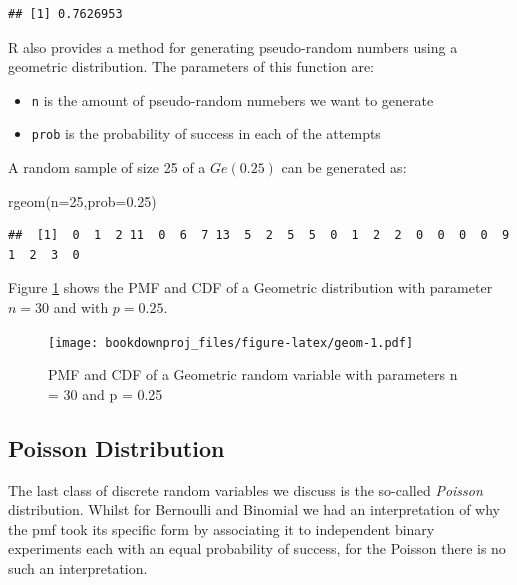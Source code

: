 \documentclass[
]{book}
\newenvironment{Shaded}{\begin{snugshade}}{\end{snugshade}}
\newcommand{\AttributeTok}[1]{\textcolor[rgb]{0.77,0.63,0.00}{#1}}
\newcommand{\DecValTok}[1]{\textcolor[rgb]{0.00,0.00,0.81}{#1}}
\newcommand{\FloatTok}[1]{\textcolor[rgb]{0.00,0.00,0.81}{#1}}
\newcommand{\FunctionTok}[1]{\textcolor[rgb]{0.00,0.00,0.00}{#1}}
\newcommand{\NormalTok}[1]{#1}
\providecommand{\tightlist}{%
  \setlength{\itemsep}{0pt}\setlength{\parskip}{0pt}}
\theoremstyle{definition}
\theoremstyle{definition}
\theoremstyle{definition}
\theoremstyle{definition}
\theoremstyle{remark}
\begin{document}
\begin{verbatim}
## [1] 0.7626953
\end{verbatim}

R also provides a method for generating pseudo-random numbers using a geometric distribution. The parameters of this function are:

\begin{itemize}
\tightlist
\item
  \texttt{n} is the amount of pseudo-random numebers we want to generate
\item
  \texttt{prob} is the probability of success in each of the attempts
\end{itemize}

A random sample of size 25 of a \(Ge(0.25)\) can be generated as:

\begin{Shaded}
\begin{Highlighting}[]
\FunctionTok{rgeom}\NormalTok{(}\AttributeTok{n=}\DecValTok{25}\NormalTok{,}\AttributeTok{prob=}\FloatTok{0.25}\NormalTok{)}
\end{Highlighting}
\end{Shaded}

\begin{verbatim}
##  [1]  0  1  2 11  0  6  7 13  5  2  5  5  0  1  2  2  0  0  0  0  9  1  2  3  0
\end{verbatim}

Figure \ref{fig:geom} shows the PMF and CDF of a Geometric distribution with parameter \(n=30\) and with \(p=0.25\).

\begin{figure}
\centering
\texttt{[image: bookdownproj\_files/figure-latex/geom-1.pdf]}
\caption{\label{fig:geom}PMF and CDF of a Geometric random variable with parameters n = 30 and p = 0.25}
\end{figure}

\hypertarget{poisson-distribution}{%
\subsection{Poisson Distribution}\label{poisson-distribution}}

The last class of discrete random variables we discuss is the so-called \emph{Poisson} distribution. Whilst for Bernoulli and Binomial we had an interpretation of why the pmf took its specific form by associating it to independent binary experiments each with an equal probability of success, for the Poisson there is no such an interpretation.
\end{document}
